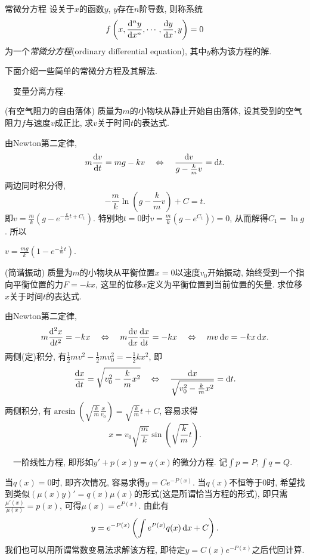 \begin{definition}{常微分方程}
	设关于$x$的函数$y$, $y$存在$n$阶导数, 则称系统$$f\left( x,\frac{\mathop{}\!\mathrm{d} ^n y}{\mathop{}\!\mathrm{d} x^n},\cdots ,\frac{\mathop{}\!\mathrm{d} y}{\mathop{}\!\mathrm{d} x},y \right)=0$$
	为一个\textit{常微分方程}(ordinary differential equation), 其中$y$称为该方程的解. 
\end{definition}

下面介绍一些简单的常微分方程及其解法. 

~~变量分离方程. 

\begin{example}
	(有空气阻力的自由落体) 质量为$m$的小物块从静止开始自由落体, 设其受到的空气阻力$f$与速度$v$成正比, 求$v$关于时间$t$的表达式. 
\end{example}
\begin{solution}
	由Newton第二定律, $$m \frac{\mathop{}\!\mathrm{d} v}{\mathop{}\!\mathrm{d} t} =mg-kv \quad \Leftrightarrow \quad \frac{\mathop{}\!\mathrm{d} v}{g-\frac{k}{m} v} = \mathop{}\!\mathrm{d} t.$$
	两边同时积分得, $$-\frac{m}{k} \ln \left(g-\frac{k}{m}v \right)+C=t.$$
	即$v=\frac{m}{k}(g-e^{-\frac{k}{m}t+C_1})$. 特别地$t=0$时$v=\frac{m}{k}(g-e^{C_1}))=0$, 从而解得$C_1=\ln g$. 所以
	\begin{center}
		$\displaystyle v = \frac{mg}{k}(1-e^{-\frac{k}{m}t}).$
	\end{center}
\end{solution}

\begin{example}
	(简谐振动) 质量为$m$的小物块从平衡位置$x=0$以速度$v_0$开始振动, 始终受到一个指向平衡位置的力$F=-kx$, 这里的位移$x$定义为平衡位置到当前位置的矢量. 求位移$x$关于时间$t$的表达式. 
\end{example}
\begin{solution}
	由Newton第二定律, $$m \frac{\dif ^2x}{\dif t^2} = -kx \quad \Leftrightarrow \quad m \frac{\dif v}{\dif x} \frac{\dif x}{\dif t} = -kx \quad \Leftrightarrow \quad mv\dif v=-kx\dif x.$$
	两侧(定)积分, 有$\frac{1}{2}mv^2-\frac{1}{2}mv_0^2 = -\frac{1}{2}kx^2$, 即$$\frac{\mathop{}\!\mathrm{d} x}{\mathop{}\!\mathrm{d} t} = \sqrt{v_0^2-\frac{k}{m}x^2} \quad \Leftrightarrow \quad \frac{\mathop{}\!\mathrm{d} x}{\sqrt{v_0^2-\frac{k}{m}x^2}} = \mathop{}\!\mathrm{d} t.$$
	两侧积分, 有$\arcsin (\sqrt{\frac{k}{m}} \frac{x}{v_0}) = \sqrt{\frac{k}{m}} t+C$, 容易求得$$x = v_0\sqrt{\frac{m}{k}}\sin \left( \sqrt{\frac{k}{m}}t \right).$$
\end{solution}

~~一阶线性方程, 即形如$y' + p(x)y=q(x)$的微分方程. 记$\int p = P, \int q = Q$. 

当$q(x)=0$时, 即齐次情况, 容易求得$y=Ce^{-P(x)}$. 当$q(x)$不恒等于$0$时, 希望找到类似$(\mu (x) y)'=q(x)\mu (x)$的形式(这是所谓恰当方程的形式), 即只需$\frac{\mu '(x)}{\mu (x)} = p(x)$, 可得$\mu (x) = e^{P(x)}$. 由此有$$y=e^{-P(x)}\left( \int e^{P(x)}q(x) \mathop{}\!\mathrm{d} x + C \right).$$
我们也可以用所谓常数变易法求解该方程, 即待定$y=C(x)e^{-P(x)}$之后代回计算. 

